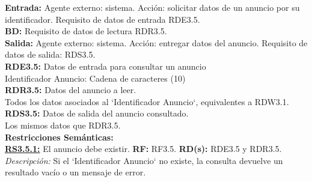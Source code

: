 \textbf{\textcolor{rojo}{Entrada:}} Agente externo: sistema. Acción: solicitar datos de un anuncio por su identificador. 
Requisito de datos de entrada \textcolor{azul}{RDE3.5}. \\[6pt]

\textbf{\textcolor{rojo}{BD:}} Requisito de datos de lectura \textcolor{azul}{RDR3.5}. \\[6pt]

\textbf{\textcolor{rojo}{Salida:}} Agente externo: sistema. Acción: entregar datos del anuncio. 
Requisito de datos de salida: \textcolor{azul}{RDS3.5}. \\[12pt]

\textcolor{azul}{\textbf{RDE3.5:}} Datos de entrada para consultar un anuncio \\
\hspace*{1cm} Identificador Anuncio: Cadena de caracteres (10) \\[12pt]

\textcolor{azul}{\textbf{RDR3.5:}} Datos del anuncio a leer. \\
\hspace*{1cm} Todos los datos asociados al `Identificador Anuncio`, equivalentes a RDW3.1. \\[12pt]

\textcolor{azul}{\textbf{RDS3.5:}} Datos de salida del anuncio consultado. \\
\hspace*{1cm} Los mismos datos que RDR3.5. \\[12pt]
 
\textbf{\textcolor{verde}{Restricciones Semánticas:}} \\[6pt]
\textbf{\textcolor{verde}{\underline{RS3.5.1:}}} El anuncio debe existir. \textbf{RF:} RF3.5. \textbf{RD(s):} RDE3.5 y RDR3.5. \\
\hspace*{1cm} \textit{Descripción:} Si el `Identificador Anuncio` no existe, la consulta devuelve un resultado vacío o un mensaje de error.



